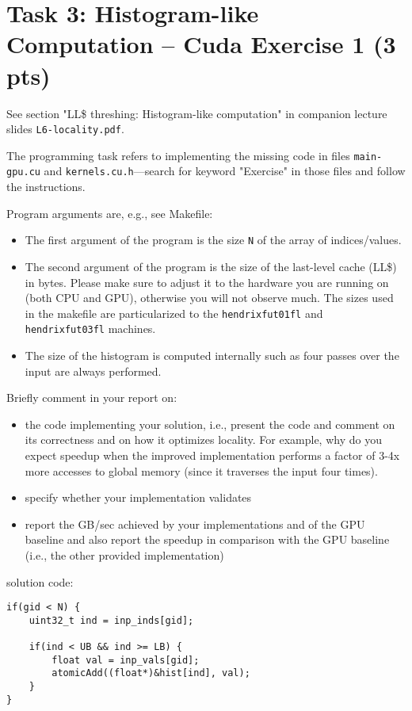 \documentclass{article}
\begin{document}
\section{Task 3: Histogram-like Computation -- Cuda Exercise 1 (3 pts)}

See section "LL\$ threshing: Histogram-like computation" in companion lecture slides \texttt{L6-locality.pdf}.

The programming task refers to implementing the missing code in files \texttt{main-gpu.cu} and \texttt{kernels.cu.h}---search for keyword "Exercise" in those files and follow the instructions.

Program arguments are, e.g., see Makefile:

\begin{itemize}
    \item The first argument of the program is the size \texttt{N} of the array of indices/values. 
    \item The second argument of the program is the size of the last-level cache (LL\$) in bytes. Please make sure to adjust it to the hardware you are running on (both CPU and GPU), otherwise you will not observe much. The sizes used in the makefile are particularized to the \texttt{hendrixfut01fl} and \texttt{hendrixfut03fl} machines.
    \item The size of the histogram is computed internally such as four passes over the input are always performed.
\end{itemize}

Briefly comment in your report on:

\begin{itemize}
    \item the code implementing your solution, i.e., present
    the code and comment on its correctness and on
    how it optimizes locality. For example, why do
    you expect speedup when the improved implementation
    performs a factor of 3-4x more accesses to global memory
    (since it traverses the input four times).
    \item specify whether your implementation validates
    \item report the GB/sec achieved by your implementations and of the GPU baseline
    and also report the speedup in comparison with the GPU baseline
    (i.e., the other provided implementation)
\end{itemize}

solution code:
\begin{lstlisting}[language=cuda]
if(gid < N) {
    uint32_t ind = inp_inds[gid];

    if(ind < UB && ind >= LB) {
        float val = inp_vals[gid];
        atomicAdd((float*)&hist[ind], val);
    }
}
\end{lstlisting}
\end{document}
